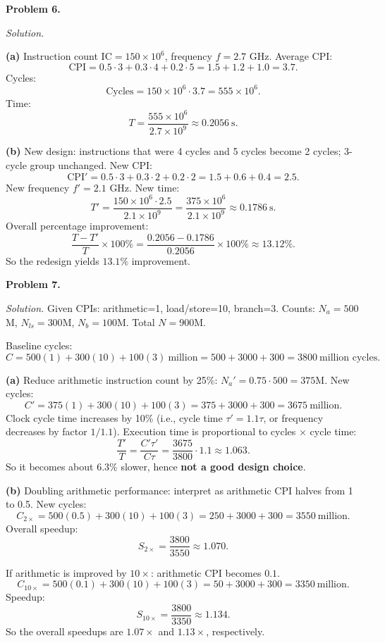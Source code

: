 \documentclass[12pt]{article}
\newcommand{\problem}[1]{\vspace{0.5em}\noindent\textbf{Problem #1.}\vspace{0.3em}}
\newenvironment{solution}{\par\noindent\textit{Solution.}}{\par\vspace{1em}}
\newcommand{\subproblem}[1]{\par\noindent\textbf{(#1)}\quad}
\begin{document}
\problem{6}
\begin{solution}
\subproblem{a}
Instruction count $\text{IC}=150\times 10^6$, frequency $f=2.7$ GHz.
Average CPI:
\[
\text{CPI}=0.5\cdot 3 + 0.3\cdot 4 + 0.2\cdot 5 = 1.5+1.2+1.0=3.7.
\]
Cycles:
\[
\text{Cycles}=150\times 10^6 \cdot 3.7 = 555\times 10^6.
\]
Time:
\[
T=\frac{555\times 10^6}{2.7\times 10^9}\approx 0.2056\ \text{s}.
\]

\subproblem{b}
New design: instructions that were 4 cycles and 5 cycles become 2 cycles; 3-cycle group unchanged.
New CPI:
\[
\text{CPI}'=0.5\cdot 3 + 0.3\cdot 2 + 0.2\cdot 2 = 1.5+0.6+0.4=2.5.
\]
New frequency $f'=2.1$ GHz.
New time:
\[
T'=\frac{150\times 10^6\cdot 2.5}{2.1\times 10^9}
=\frac{375\times 10^6}{2.1\times 10^9}\approx 0.1786\ \text{s}.
\]
Overall percentage improvement:
\[
\frac{T-T'}{T}\times 100\%
=\frac{0.2056-0.1786}{0.2056}\times 100\%
\approx 13.12\%.
\]
So the redesign yields \(\boxed{13.1\%}\) improvement.

\end{solution}

\problem{7}
\begin{solution}
Given CPIs: arithmetic=1, load/store=10, branch=3.
Counts: $N_a=500$M, $N_{ls}=300$M, $N_b=100$M. Total $N=900$M.

Baseline cycles:
\[
C = 500(1)+300(10)+100(3)\ \text{million}
=500+3000+300=3800\ \text{million cycles}.
\]

\subproblem{a}
Reduce arithmetic instruction count by 25\%: $N_a'=0.75\cdot 500=375$M.
New cycles:
\[
C' = 375(1)+300(10)+100(3)=375+3000+300=3675\ \text{million}.
\]
Clock cycle time increases by 10\% (i.e., cycle time $\tau' = 1.1\tau$, or frequency decreases by factor $1/1.1$). Execution time is proportional to cycles $\times$ cycle time:
\[
\frac{T'}{T}=\frac{C'\tau'}{C\tau}=\frac{3675}{3800}\cdot 1.1 \approx 1.063.
\]
So it becomes about \(\boxed{6.3\%}\) slower, hence \textbf{not a good design choice}.

\subproblem{b}
Doubling arithmetic performance: interpret as arithmetic CPI halves from 1 to 0.5.
New cycles:
\[
C_{2\times}=500(0.5)+300(10)+100(3)=250+3000+300=3550\ \text{million}.
\]
Overall speedup:
\[
S_{2\times}=\frac{3800}{3550}\approx 1.070.
\]

If arithmetic is improved by $10\times$: arithmetic CPI becomes $0.1$.
\[
C_{10\times}=500(0.1)+300(10)+100(3)=50+3000+300=3350\ \text{million}.
\]
Speedup:
\[
S_{10\times}=\frac{3800}{3350}\approx 1.134.
\]
So the overall speedups are \(\boxed{1.07\times}\) and \(\boxed{1.13\times}\), respectively.

\end{solution}
\end{document}
